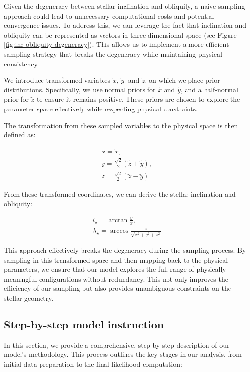 \documentclass[twocolumn]{aastex631}
\begin{document}
Given the degeneracy between stellar inclination and obliquity, a naive sampling approach could lead to unnecessary computational costs and potential 
convergence issues. To address this, we can leverage the fact that inclination and obliquity can be represented as vectors in three-dimensional 
space (see Figure \ref{fig:inc-obliquity-degeneracy}). This allows us to implement a more efficient sampling strategy that breaks the degeneracy 
while maintaining physical consistency.

We introduce transformed variables $\tilde{x}$, $\tilde{y}$, and $\tilde{z}$, on which we place prior distributions. 
Specifically, we use normal priors for $\tilde{x}$ and $\tilde{y}$, and a half-normal prior for $\tilde{z}$ to ensure it remains positive. 
These priors are chosen to explore the parameter space effectively while respecting physical constraints.

The transformation from these sampled variables to the physical space is then defined as:
\begin{linenomath}\begin{align}
    \label{eq:xyz}
    x = \tilde{x}, \\ 
    y = \frac{\sqrt{2}}{2} (\tilde{z} + \tilde{y}), \\
    z = \frac{\sqrt{2}}{2} (\tilde{z} - \tilde{y})
\end{align}\end{linenomath}

From these transformed coordinates, we can derive the stellar inclination and obliquity:

\begin{linenomath}\begin{align}
    \label{eq:obl-inc}
    i_\star = \arctan{\frac{y}{x}}, \\ 
    \lambda_\star = \arccos{\frac{z}{\sqrt{x^2 + y^2 + z^2}}}
\end{align}\end{linenomath}

This approach effectively breaks the degeneracy during the sampling process. By sampling in this transformed space and then mapping back to 
the physical parameters, we ensure that our model explores the full range of physically meaningful configurations without redundancy. 
This not only improves the efficiency of our sampling but also provides unambiguous constraints on the stellar geometry.

\subsection{Step-by-step model instruction}
In this section, we provide a comprehensive, step-by-step description of our model's methodology. 
This process outlines the key stages in our analysis, from initial data preparation to the final likelihood computation:
\end{document}
